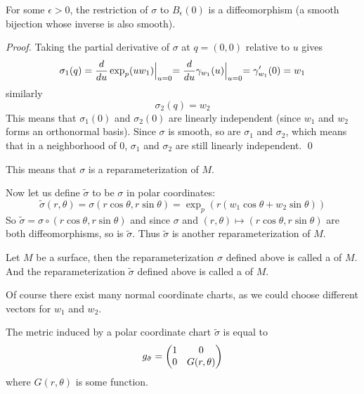 \begin{prop*}

    For some $\epsilon>0$, the restriction of $\sigma$ to $B_\epsilon(0)$ is a diffeomorphism (a smooth bijection whose inverse is also smooth).

\end{prop*}

\begin{proof}

    Taking the partial derivative of $\sigma$ at $q=(0,0)$ relative to $u$ gives
    \[ \sigma_1(q) = \frac d{du}\exp_p(uw_1)\Bigl|_{u=0} = \frac d{du}\gamma_{w_1}(u)\Bigl|_{u=0} = \gamma'_{w_1}(0) = w_1 \]
    similarly
    \[ \sigma_2(q) = w_2 \]
    This means that $\sigma_1(0)$ and $\sigma_2(0)$ are linearly independent (since $w_1$ and $w_2$ forms an orthonormal basis).
    Since $\sigma$ is smooth, so are $\sigma_1$ and $\sigma_2$, which means that in a neighborhood of $0$, $\sigma_1$ and $\sigma_2$ are still linearly independent.
    \qed

\end{proof}

This means that $\sigma$ is a reparameterization of $M$.

Now let us define $\tilde\sigma$ to be $\sigma$ in polar coordinates:
\[ \tilde\sigma(r,\theta) = \sigma(r\cos\theta,r\sin\theta) = \exp_p(r(w_1\cos\theta + w_2\sin\theta)) \]
So $\tilde\sigma=\sigma\circ(r\cos\theta,r\sin\theta)$ and since $\sigma$ and $(r,\theta)\mapsto(r\cos\theta,r\sin\theta)$ are both diffeomorphisms, so is $\tilde\sigma$.
Thus $\tilde\sigma$ is another reparameterization of $M$.

\begin{defn*}

    Let $M$ be a surface, then the reparameterization $\sigma$ defined above is called a  of $M$.
    And the reparameterization $\tilde\sigma$ defined above is called a  of $M$.

\end{defn*}

Of course there exist many normal coordinate charts, as we could choose different vectors for $w_1$ and $w_2$.

\begin{lemm*}

    The metric induced by a polar coordinate chart $\tilde\sigma$ is equal to
    \[ g_{\tilde\sigma} = \begin{pmatrix}1 & 0 \\ 0 & G(r,\theta)\end{pmatrix} \]
    where $G(r,\theta)$ is some function.

\end{lemm*}

